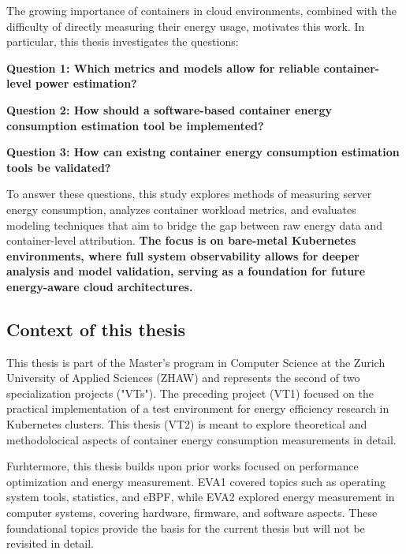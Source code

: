 The growing importance of containers in cloud environments, combined with the difficulty of directly measuring their energy usage, motivates this work. In particular, this thesis investigates the questions:

\textbf{Question 1: Which metrics and models allow for reliable container-level power estimation?}

\textbf{Question 2: How should a software-based container energy consumption estimation tool be implemented?}

\textbf{Question 3: How can existng container energy consumption estimation tools be validated?}

To answer these questions, this study explores methods of measuring server energy consumption, analyzes container workload metrics, and evaluates modeling techniques that aim to bridge the gap between raw energy data and container-level attribution. \textbf{The focus is on bare-metal Kubernetes environments, where full system observability allows for deeper analysis and model validation, serving as a foundation for future energy-aware cloud architectures.} 

\subsection{Context of this thesis}

This thesis is part of the Master's program in Computer Science at the Zurich University of Applied Sciences (ZHAW) and represents the second of two specialization projects ("VTs"). The preceding project (VT1) focused on the practical implementation of a test environment for energy efficiency research in Kubernetes clusters. This thesis (VT2) is meant to explore theoretical and methodolocical aspects of container energy consumption measurements in detail.

Furhtermore, this thesis builds upon prior works focused on performance optimization and energy measurement. EVA1 covered topics such as operating system tools, statistics, and eBPF, while EVA2 explored energy measurement in computer systems, covering hardware, firmware, and software aspects. These foundational topics provide the basis for the current thesis but will not be revisited in detail.


